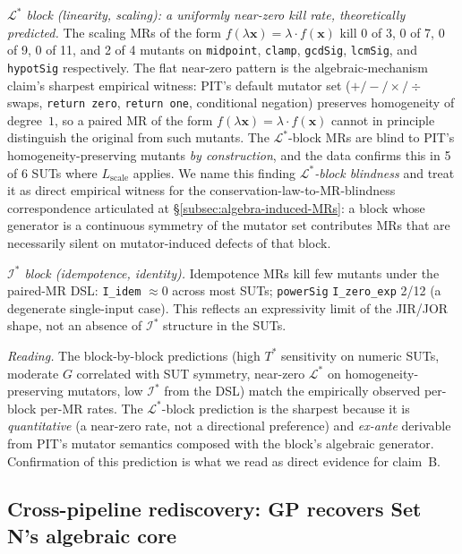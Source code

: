 \textit{$\mathcal{L}^{*}$ block (linearity, scaling): a uniformly
near-zero kill rate, theoretically predicted.} The scaling MRs of the
form $f(\lambda \mathbf{x}) = \lambda \cdot f(\mathbf{x})$ kill 0 of
3, 0 of 7, 0 of 9, 0 of 11, and 2 of 4 mutants on \texttt{midpoint},
\texttt{clamp}, \texttt{gcdSig}, \texttt{lcmSig}, and
\texttt{hypotSig} respectively. The flat near-zero pattern is the
algebraic-mechanism claim's sharpest empirical witness: PIT's default
mutator set ($+/-/\times/\div$ swaps, \texttt{return zero},
\texttt{return one}, conditional negation) preserves homogeneity of
degree~$1$, so a paired MR of the form
$f(\lambda \mathbf{x}) = \lambda \cdot f(\mathbf{x})$ cannot in
principle distinguish the original from such mutants. The
$\mathcal{L}^{*}$-block MRs are blind to PIT's homogeneity-preserving
mutants \emph{by construction}, and the data confirms this in 5 of 6
SUTs where $L_{\mathrm{scale}}$ applies. We name this finding
\emph{$\mathcal{L}^{*}$-block blindness} and treat it as direct
empirical witness for the conservation-law-to-MR-blindness
correspondence articulated at \S\ref{subsec:algebra-induced-MRs}: a
block whose generator is a continuous symmetry of the mutator set
contributes MRs that are necessarily silent on mutator-induced
defects of that block.

\textit{$\mathcal{I}^{*}$ block (idempotence, identity).} Idempotence
MRs kill few mutants under the paired-MR DSL: \texttt{I\_idem}
$\approx 0$ across most SUTs; \texttt{powerSig} \texttt{I\_zero\_exp}
2/12 (a degenerate single-input case). This reflects an expressivity
limit of the JIR/JOR shape, not an absence of $\mathcal{I}^{*}$
structure in the SUTs.

\textit{Reading.} The block-by-block predictions (high $T^{*}$
sensitivity on numeric SUTs, moderate $G$ correlated with SUT
symmetry, near-zero $\mathcal{L}^{*}$ on
homogeneity-preserving mutators, low $\mathcal{I}^{*}$ from the DSL)
match the empirically observed per-block per-MR rates. The
$\mathcal{L}^{*}$-block prediction is the sharpest because it is
\emph{quantitative} (a near-zero rate, not a directional preference)
and \emph{ex-ante} derivable from PIT's mutator semantics composed
with the block's algebraic generator. Confirmation of this prediction
is what we read as direct evidence for claim~B.

\subsection{Cross-pipeline rediscovery: GP recovers Set N's algebraic core}
\label{subsec:rediscovery}

